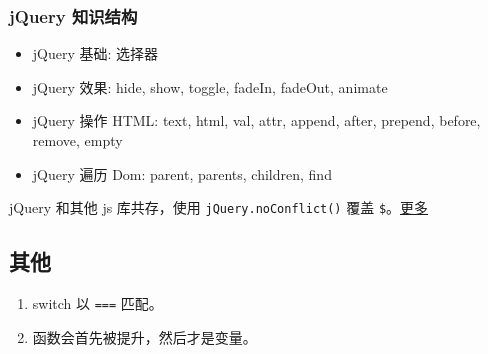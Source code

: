 \subsubsection{jQuery 知识结构}\hypertarget{jquery-}{}\label{jquery-}

\begin{itemize}
\item jQuery 基础: 选择器
\item jQuery 效果: hide, show, toggle, fadeIn, fadeOut, animate
\item jQuery 操作 HTML: text, html, val, attr, append, after, prepend, before, remove, empty
\item jQuery 遍历 Dom: parent, parents, children, find
\end{itemize}

jQuery 和其他 js 库共存，使用 \texttt{jQuery.noConflict()} 覆盖 \texttt{\$}。\href{http://www.cnblogs.com/lostyu/p/3534751.html}{更多}

\subsection{其他}\hypertarget{section-12}{}\label{section-12}

\begin{enumerate}
\item switch 以 \texttt{===} 匹配。
\item 函数会首先被提升，然后才是变量。
\end{enumerate}
